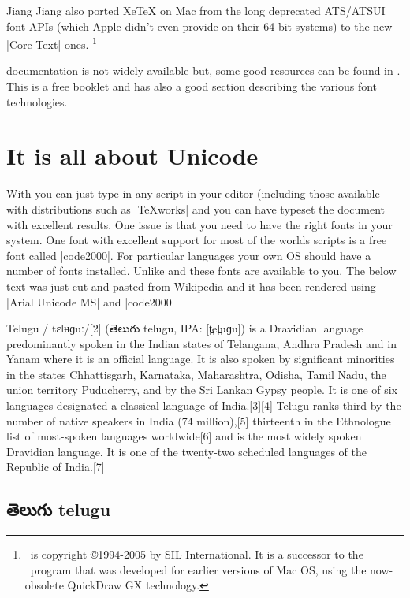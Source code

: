 Jiang Jiang also ported XeTeX on Mac from the long deprecated ATS/ATSUI font APIs (which Apple didn’t even provide on their 64-bit systems) to the new |Core Text| ones.
\footnote{\XeTeX\ is copyright ©1994-2005 by SIL International. It is a successor to the \TeXgX\ program that was developed for earlier versions of Mac OS, using the now-obsolete QuickDraw GX technology.}

\XeTeX documentation is not widely available but, some good resources can be found in \citep{xetexcompanion}. This is a free booklet and has also a good section describing the various font technologies.

\section{It is all about Unicode}

With \XeLaTeX you can just type in any script in your editor (including those available with \tex distributions such as |TeXworks| and you can have \XeLaTeX typeset the document with excellent results. One issue is that you need to have the right fonts in your system. One font with excellent support for most of the worlds scripts is a free font called |code2000|. For particular languages your own OS should have a number of fonts installed. Unlike \tex and \latexe these fonts are available to you. The below text was just cut and pasted from Wikipedia and it has been rendered using |Arial Unicode MS| and |code2000|



Telugu /ˈtɛlʉɡuː/[2] (తెలుగు telugu, IPA: [t̪el̪uɡu]) is a Dravidian language predominantly spoken in the Indian states of Telangana, Andhra Pradesh and in Yanam where it is an official language. It is also spoken by significant minorities in the states Chhattisgarh, Karnataka, Maharashtra, Odisha, Tamil Nadu, the union territory Puducherry, and by the Sri Lankan Gypsy people. It is one of six languages designated a classical language of India.[3][4] Telugu ranks third by the number of native speakers in India (74 million),[5] thirteenth in the Ethnologue list of most-spoken languages worldwide[6] and is the most widely spoken Dravidian language. It is one of the twenty-two scheduled languages of the Republic of India.[7]




\subsection{\protect\telugufam   తెలుగు telugu}

